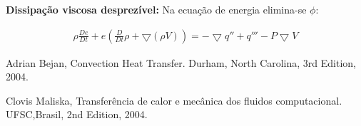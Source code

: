 \documentclass[]{article}
\begin{document}
\textbf{Dissipação viscosa desprezível:}
Na ecuação de energia elimina-se $\phi$:

\begin{equation}
	\begin{aligned}
		\rho \frac{ De}{Dt} + e(\frac{D}{D t} \rho +  \bigtriangledown (\rho V)) = -\bigtriangledown q'' + q''' - P\bigtriangledown V 
	\end{aligned}
\end{equation}


\begin{thebibliography}{999}
	
	Adrian Bejan,
	Convection Heat Transfer.
	Durham, North Carolina,
	3rd Edition,
	2004.
	
	Clovis Maliska,
	Transferência de calor e mecânica dos fluidos computacional.
	UFSC,Brasil,
	2nd Edition,
	2004.
	
\end{thebibliography}
\end{document}

